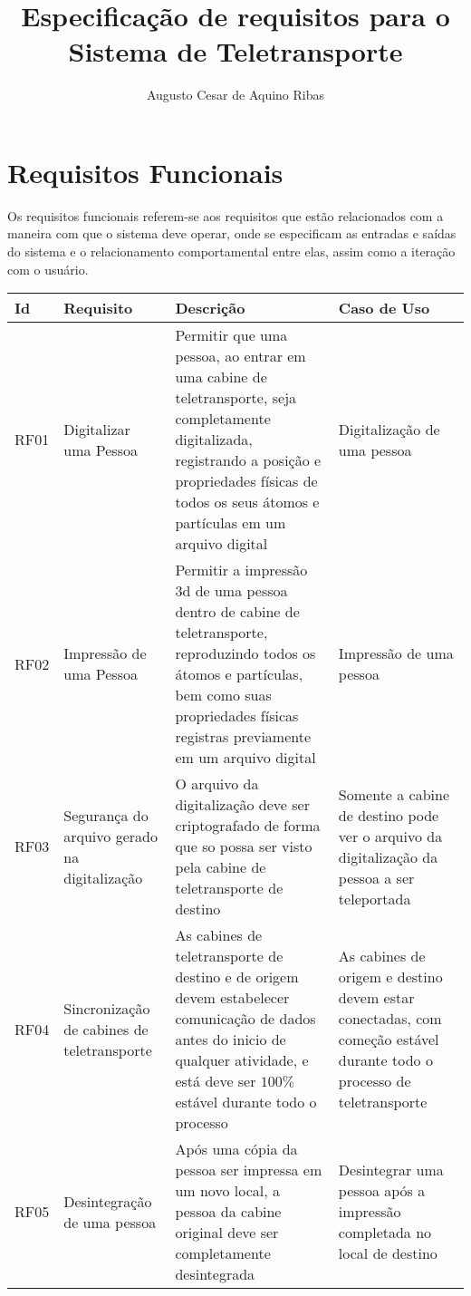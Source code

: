 \documentclass[a4paper,10pt]{article}
\title{Especificação de requisitos para o Sistema de Teletransporte}
\author{Augusto Cesar de Aquino Ribas}
\begin{document}
\maketitle

\section{Requisitos Funcionais}

Os requisitos funcionais referem-se aos requisitos que estão relacionados com a
maneira com que o sistema deve operar, onde se especificam as entradas e saídas do sistema e o relacionamento comportamental entre elas, assim como a iteração com o usuário. 

\begin{center}
    \begin{longtable}{ | l | p{2.5cm} | p{5cm} | p{2.5cm} |}
    \hline
    Id & Requisito & Descrição & Caso de Uso \\ \hline
    RF01 & Digitalizar uma Pessoa & Permitir que uma pessoa, ao entrar em uma cabine de teletransporte, seja completamente digitalizada, registrando a posição e propriedades físicas de todos os seus átomos e partículas em um arquivo digital & Digitalização de uma pessoa \\ \hline
    RF02 & Impressão de uma Pessoa & Permitir a impressão 3d de uma pessoa dentro de cabine de teletransporte, reproduzindo todos os átomos e partículas, bem como suas propriedades físicas registras previamente em um arquivo digital & Impressão de uma pessoa \\ \hline
    RF03 & Segurança do arquivo gerado na digitalização & O arquivo da digitalização deve ser criptografado de forma que so possa ser visto pela cabine de teletransporte de destino & Somente a cabine de destino pode ver o arquivo da digitalização da pessoa a ser teleportada \\ \hline
    RF04 & Sincronização de cabines de teletransporte & As cabines de teletransporte de destino e de origem devem estabelecer comunicação de dados antes do inicio de qualquer atividade, e está deve ser $100\%$ estável durante todo o processo & As cabines de origem e destino devem estar conectadas, com começão estável durante todo o processo de teletransporte \\ \hline
    RF05 & Desintegração de uma pessoa & Após uma cópia da pessoa ser impressa em um novo local, a pessoa da cabine original deve ser completamente desintegrada & Desintegrar uma pessoa após a impressão completada no local de destino \\ \hline
    \end{longtable}
\end{center}
\end{document}
